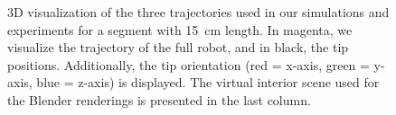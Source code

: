 \begin{figure}[ht]
  \centering
  \hspace{0.005\textwidth}%
  \hspace{0.005\textwidth}%
  \hfill
  \caption{3D visualization of the three trajectories used in our simulations and experiments for a segment with \SI{15}{cm} length. In magenta, we visualize the trajectory of the full robot, and in black, the tip positions. Additionally, the tip orientation (red = x-axis, green = y-axis, blue = z-axis) is displayed. The virtual interior scene used for the Blender renderings is presented in the last column.}
  \label{fig:srslam:trajectories}
\end{figure}

